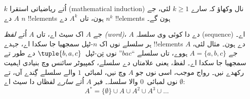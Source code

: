 \documentclass[../../../include/open-logic-section]{subfiles}
\begin{document}
\begin{prob}
$k$ اُتے ریاضیاتی استقرا (mathematical induction) نال وکھاؤ کہ سارے
$k \ge 1$ لئی، جے $A$ دے
$n$ !!{element}s ہون، تاں $A^k$ دے $n^k$ !!{element}s ہون گے۔
\end{prob}

\begin{ex}
جے $A$ اک سیٹ اے، تاں $A$ اُتے \emph{لفظ (word)}، $A$ دے
 دا کوئی وی سلسلہ (sequence) اے۔ ہر سلسلے نوں
اک $n$-ٹپل سمجھیا جا سکدا اے، جہدے !!{element}s $A$ دے ہون۔ مثال لئی، جے
$A = \{a, b, c\}$ ہووے، تاں سلسلے ``$bac$'' نوں تِن-ٹپل~$\tuple{b, a, c}$
دے طور تے سمجھیا
جا سکدا اے۔ لفظ، یعنی علامتاں دے سلسلے، کمپیوٹر سائنس وچ بنیادی اہمیت
رکھدے نیں۔ رواج موجب، اسی  نوں جو $A$ وچ نیں،
لمبائی~$1$ والے سلسلے گِندے آں، تے $\emptyset$ نوں لمبائی~$0$ والا سلسلہ۔
فیر $A$ اُتے \emph{سارے} لفظاں دا سیٹ اے:
\[
A^* = \{\emptyset\} \cup A \cup A^2 \cup A^3 \cup \dots
\]
\end{ex}
\end{document}
